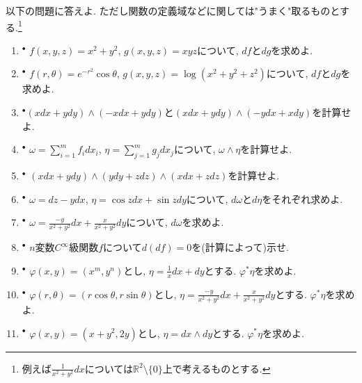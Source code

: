 \documentclass[dvipdfmx,a4paper,11pt]{article}
\newcommand{\R}{\mathbb{R}}
\theoremstyle{definition}
\begin{document}
  \newpage 


以下の問題に答えよ. 
ただし関数の定義域などに関しては"うまく"取るものとする.\footnote{例えば$\frac{1}{x^2 + y^2} dx $については$\R^2\setminus \{ 0\}$上で考えるものとする. }
\vspace{11pt}

\begin{enumerate}[label=\textbf{問}\ref*{sec-Rn-diff}.\arabic*]

\item $^{\bullet}$ $f(x,y,z)=x^2 + y^2$, $g(x,y,z) = xyz$について, $df$と$dg$を求めよ.

\item $^{\bullet}$ $f(r, \theta) = e^{-r^2} \cos \theta$, $g(x,y,z) = \log (x^2 + y^2 + z^2)$について, $df$と$dg$を求めよ.

\item $^{\bullet}$$(x dx + y dy ) \wedge (-x dx + y dy)$と$(x dx + y dy ) \wedge (-y dx +  x dy)$を計算せよ. 

\item $^{\bullet}$ $\omega = \sum_{i=1}^{m} f_i dx_i$, $\eta= \sum_{j=1}^{m} g_j dx_j$について, $\omega \wedge \eta$を計算せよ.  

\item $^{\bullet}$ $(xdx + y dy) \wedge (ydy + zdz) \wedge (xdx + zdz)$を計算せよ. 


\item $^{\bullet}$ $\omega = dz - y dx$, $\eta = \cos z dx +  \sin z dy$について, $d \omega$と$d \eta$をそれぞれ求めよ. 

\item $^{\bullet}$ $\omega = \frac{-y}{x^2 + y^2} dx + \frac{x}{x^2 + y^2} dy$について, $d \omega$を求めよ. 

\item $^{\bullet}$  $n$変数$C^{\infty}$級関数$f$について$d (df)=0$を(計算によって)示せ.

\item $^{\bullet}$ $\varphi(x, y) = (x^m, y^n)$とし, $\eta = \frac{1}{x}dx + dy$とする. 
$\varphi^{*}\eta$を求めよ. 

\item $^{\bullet}$ $\varphi(r, \theta) = (r \cos \theta, r \sin \theta)$とし, $\eta = \frac{-y}{x^2 + y^2} dx + \frac{x}{x^2 + y^2} dy$とする. 
$\varphi^{*}\eta$を求めよ. 

\item $^{\bullet}$ $\varphi(x, y) = (x + y^2, 2y)$とし, $\eta = dx \wedge dy$とする. 
$\varphi^{*}\eta$を求めよ. 


\end{enumerate}
\end{document}
